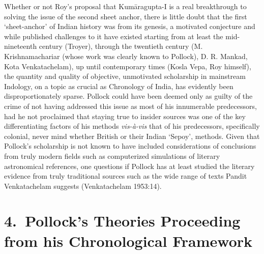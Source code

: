 Whether or not Roy’s proposal that Kumāragupta-I is a real breakthrough to solving the issue of the second sheet anchor, there is little doubt that the first ‘sheet-anchor’ of Indian history was from its genesis, a motivated conjecture and while published challenges to it have existed starting from at least the mid-nineteenth century (Troyer), through the twentieth century (M. Krishnamachariar (whose work was clearly known to Pollock), D. R. Mankad, Kota Venkatachelam), up until contemporary times (Kosla Vepa, Roy himself), the quantity and quality of objective, unmotivated scholarship in mainstream Indology, on a topic as crucial as Chronology of India, has evidently been disproportionately sparse. Pollock could have been deemed only as guilty of the crime of not having addressed this issue as most of his innumerable predecessors, had he not proclaimed that staying true to insider sources was one of the key differentiating factors of his methods \textit{vis-à-vis} that of his predecessors, specifically colonial, never mind whether British or their Indian ‘Sepoy’, methods. Given that Pollock’s scholarship is not known to have included considerations of conclusions from truly modern fields such as computerized simulations of literary astronomical references, one questions if Pollock has at least studied the literary evidence from truly traditional sources such as the wide range of texts Pandit Venkatachelam suggests (Venkatachelam 1953:14).



\section*{4.~Pollock’s Theories Proceeding from his Chronological Framework}

